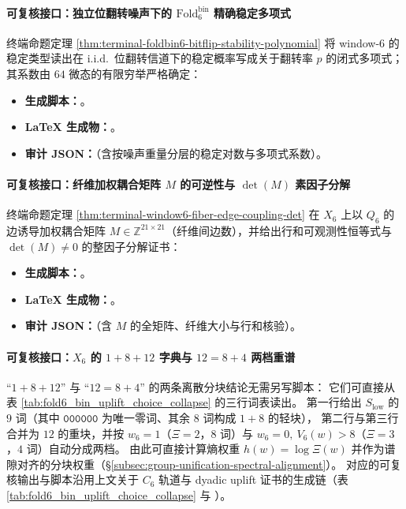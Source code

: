 \paragraph{可复核接口：独立位翻转噪声下的 \texorpdfstring{$\mathrm{Fold}^{\mathrm{bin}}_6$}{Foldbin6} 精确稳定多项式}
终端命题定理 \ref{thm:terminal-foldbin6-bitflip-stability-polynomial} 将 window-\(6\) 的稳定类型读出在 i.i.d.\ 位翻转信道下的稳定概率写成关于翻转率 \(p\) 的闭式多项式；其系数由 \(64\) 微态的有限穷举严格确定：
\begin{itemize}
  \item \textbf{生成脚本：}\texttt{}。
  \item \textbf{LaTeX 生成物：}\texttt{}。
  \item \textbf{审计 JSON：}\texttt{}（含按噪声重量分层的稳定对数与多项式系数）。
\end{itemize}

\paragraph{可复核接口：纤维加权耦合矩阵 \(M\) 的可逆性与 \texorpdfstring{$\det(M)$}{det(M)} 素因子分解}
终端命题定理 \ref{thm:terminal-window6-fiber-edge-coupling-det} 在 \(X_6\) 上以 \(Q_6\) 的边诱导加权耦合矩阵 \(M\in\mathbb{Z}^{21\times 21}\)（纤维间边数），并给出行和可观测性恒等式与 \(\det(M)\neq 0\) 的整因子分解证书：
\begin{itemize}
  \item \textbf{生成脚本：}\texttt{}。
  \item \textbf{LaTeX 生成物：}\texttt{}。
  \item \textbf{审计 JSON：}\texttt{}（含 \(M\) 的全矩阵、纤维大小与行和核验）。
\end{itemize}

\paragraph{可复核接口：\texorpdfstring{$X_6$}{X6} 的 \(1+8+12\) 字典与 \(12=8+4\) 两档重谱}
“\(1+8+12\)” 与 “\(12=8+4\)” 的两条离散分块结论无需另写脚本：
它们可直接从表 \ref{tab:fold6_bin_uplift_choice_collapse} 的三行词表读出。
第一行给出 \(S_{\mathrm{low}}\) 的 \(9\) 词（其中 \(\texttt{000000}\) 为唯一零词、其余 \(8\) 词构成 \(1+8\) 的轻块），
第二行与第三行合并为 \(12\) 的重块，并按 \(w_6=1\)（\(\Xi=2\)，\(8\) 词）与 \(w_6=0,\ V_6(w)>8\)（\(\Xi=3\)，\(4\) 词）自动分成两档。
由此可直接计算熵权重 \(h(w)=\log\Xi(w)\) 并作为谱隙对齐的分块权重（\S\ref{subsec:group-unification-spectral-alignment}）。
对应的可复核输出与脚本沿用上文关于 \(C_6\) 轨道与 dyadic uplift 证书的生成链（表 \ref{tab:fold6_bin_uplift_choice_collapse} 与
\texttt{}）。

